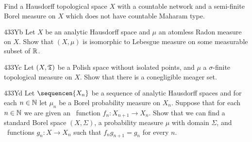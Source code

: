 {
Find a Hausdorff topological space $X$ with a countable network and a
semi-finite Borel measure on $X$ which does not have countable Maharam
type.

\spheader 433Yb
Let $X$ be an analytic Hausdorff space and $\mu$ an atomless
Radon measure on $X$.   Show that $(X,\mu)$ is isomorphic to Lebesgue
measure on some measurable subset of $\Bbb R$.   
%

\spheader 433Yc Let $(X,\frak T)$ be a Polish space without isolated
points, and $\mu$ a $\sigma$-finite topological measure on $X$.
Show that there is a conegligible meager set.   

\spheader 433Yd Let $\sequencen{X_n}$ be a sequence of analytic
Hausdorff spaces
and for each $n\in\Bbb N$ let $\mu_n$ be a Borel probability measure on
$X_n$.   Suppose that for each $n\in\Bbb N$ we are
given an \imp\ function $f_n:X_{n+1}\to X_n$.   Show that we can find a
standard Borel space $(X,\Sigma)$, a probability measure $\mu$ with
domain $\Sigma$, and \imp\ functions $g_n:X\to X_n$ such that
$f_ng_{n+1}=g_n$ for every $n$.
}%

